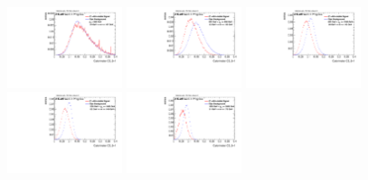 \begin{figure}[H]
\includegraphics[width=0.3\textwidth]{sascha_input/Appendix/Distributions/higgs/distributions/beta1/h_recoJet_C2_bin1.pdf} \hspace{1mm}
\includegraphics[width=0.3\textwidth]{sascha_input/Appendix/Distributions/higgs/distributions/beta1/h_recoJet_C2_bin2.pdf} \hspace{4mm}
\includegraphics[width=0.3\textwidth]{sascha_input/Appendix/Distributions/higgs/distributions/beta1/h_recoJet_C2_bin3.pdf} 
\bigskip
\includegraphics[width=0.3\textwidth]{sascha_input/Appendix/Distributions/higgs/distributions/beta1/h_recoJet_C2_bin4.pdf} \hspace{4mm}
\includegraphics[width=0.3\textwidth]{sascha_input/Appendix/Distributions/higgs/distributions/beta1/h_recoJet_C2_bin5.pdf} 


\end{figure}

